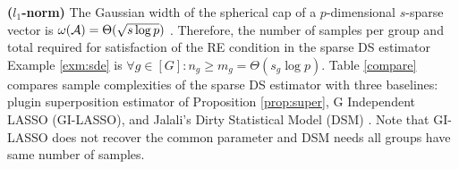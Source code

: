 \begin{example}
	{\bf ($l_1$-norm)} The Gaussian width of the spherical cap of a $p$-dimensional $s$-sparse vector is $\omega(\cA) = \Theta(\sqrt{s\log p})$ \cite{banerjee14, vershynin2018high}. Therefore, the number of samples per group and total required for satisfaction of the RE condition in the sparse DS estimator Example \ref{exm:sde} is $\forall g \in [G]: n_g \geq m_g = \Theta(s_g \log p)$. 
	Table \ref{compare} compares sample complexities of the sparse DS estimator with three baselines: plugin superposition estimator of Proposition \ref{prop:super}, G Independent LASSO (GI-LASSO), and Jalali's Dirty Statistical Model (DSM) \cite{jrsr10}. Note that GI-LASSO does not recover the common parameter and DSM needs all groups have same number of samples. %
\end{example}



